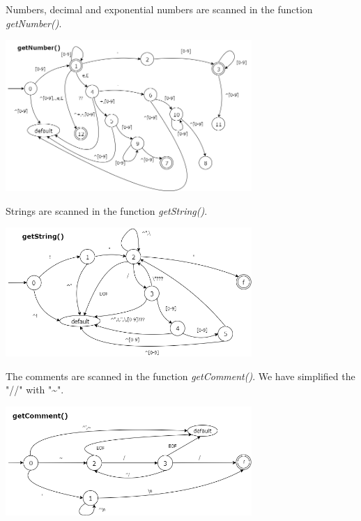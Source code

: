 \documentclass[10pt,a4paper,titlepage]{article}
\begin{document}
\begin{justify}
Numbers, decimal and exponential numbers are scanned in the function \textit{getNumber()}.
\end{justify}
\begin{center}
  \includegraphics[width=0.7\textwidth]{img/getNumber.png}
\end{center}

\begin{justify}
Strings are scanned in the function \textit{getString()}.
\end{justify}
\begin{center}
  \includegraphics[width=0.7\textwidth]{img/getString.png}
\end{center}

\begin{justify}
The comments are scanned in the function \textit{getComment()}. We have simplified the "//" with "\textasciitilde".
\end{justify}
\begin{center}
  \includegraphics[width=0.7\textwidth]{img/getComment.png}
\end{center}
\end{document}
